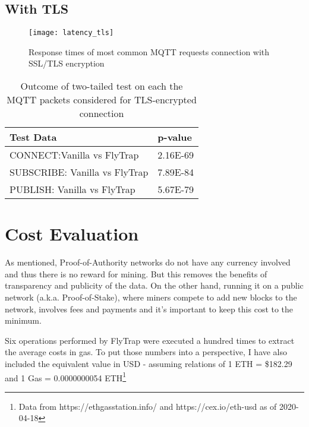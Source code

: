 \subsection{With TLS}
\begin{figure}[h]
    \centering
    \texttt{[image: latency\_tls]}
    \caption{Response times of most common MQTT requests connection with SSL/TLS encryption}
    \label{fig:latency_tls}
\end{figure}

\begin{table}[]
\centering
\begin{tabular}{|l|l|}
\hline
\textbf{Test Data}   & \textbf{p-value} \\ \hline
CONNECT:Vanilla vs FlyTrap    & 2.16E-69         \\ \hline
SUBSCRIBE: Vanilla vs FlyTrap & 7.89E-84         \\ \hline
PUBLISH: Vanilla vs FlyTrap   & 5.67E-79         \\ \hline
\end{tabular}
\caption{Outcome of two-tailed test on each the MQTT packets considered for TLS-encrypted connection}
\label{tab:ttest-tls}
\end{table}

\section{Cost Evaluation}
As mentioned, Proof-of-Authority networks do not have any currency involved and thus there is no reward for mining. But this removes the benefits of transparency and publicity of the data. On the other hand, running it on a public network (a.k.a. Proof-of-Stake), where miners compete to add new blocks to the network, involves fees and payments and it's important to keep this cost to the minimum.

Six operations performed by FlyTrap were executed a hundred times to extract the average costs in gas. To put those numbers into a perspective, I have also included the equivalent value in USD - assuming relations of 1 ETH = \$182.29 and 1 Gas = 0.0000000054 ETH\footnote{Data from https://ethgasstation.info/ and https://cex.io/eth-usd as of 2020-04-18}


